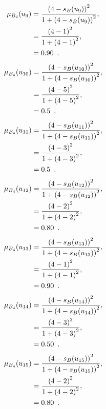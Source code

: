 \documentclass[a4paper,openany]{book}
\begin{document}
				\begin{align}
					\mu_{B_4}(u_9) &= \frac{\left(4-s_B(u_9)\right)^2}{1 + \left(4-s_B(u_9)\right)^2} ,\\
					&= \frac{\left(4-1\right)^2}{1 + \left(4-1\right)^2} \notag ,\\
					&= 0.90 \enspace. \notag
				\end{align}
				\begin{align}
					\mu_{B_4}(u_{10}) &= \frac{\left(4-s_B(u_{10})\right)^2}{1 + \left(4-s_B(u_{10})\right)^2} ,\\
					&= \frac{\left(4-5\right)^2}{1 + \left(4-5\right)^2} \notag ,\\
					&= 0.5 \enspace. \notag
				\end{align}
				\begin{align}
					\mu_{B_4}(u_{11}) &= \frac{\left(4-s_B(u_{11})\right)^2}{1 + \left(4-s_B(u_{11})\right)^2} ,\\
					&= \frac{\left(4-3\right)^2}{1 + \left(4-3\right)^2} \notag ,\\
					&= 0.5 \enspace. \notag
				\end{align}
				\begin{align}
					\mu_{B_4}(u_{12}) &= \frac{\left(4-s_B(u_{12})\right)^2}{1 + \left(4-s_B(u_{12})\right)^2} ,\\
					&= \frac{\left(4-2\right)^2}{1 + \left(4-2\right)^2} \notag ,\\
					&= 0.80 \enspace. \notag
				\end{align}
				\begin{align}
					\mu_{B_4}(u_{13}) &= \frac{\left(4-s_B(u_{13})\right)^2}{1 + \left(4-s_B(u_{13})\right)^2} ,\\
					&= \frac{\left(4-1\right)^2}{1 + \left(4-1\right)^2} \notag ,\\
					&= 0.90 \enspace. \notag
				\end{align}
				\begin{align}
					\mu_{B_4}(u_{14}) &= \frac{\left(4-s_B(u_{14})\right)^2}{1 + \left(4-s_B(u_{14})\right)^2} ,\\
					&= \frac{\left(4-3\right)^2}{1 + \left(4-3\right)^2} \notag ,\\
					&= 0.50 \enspace. \notag
				\end{align}
				\begin{align}
					\mu_{B_4}(u_{15}) &= \frac{\left(4-s_B(u_{15})\right)^2}{1 + \left(4-s_B(u_{15})\right)^2} ,\\
					&= \frac{\left(4-2\right)^2}{1 + \left(4-2\right)^2} \notag ,\\
					&= 0.80 \enspace. \notag
				\end{align}
\end{document}
